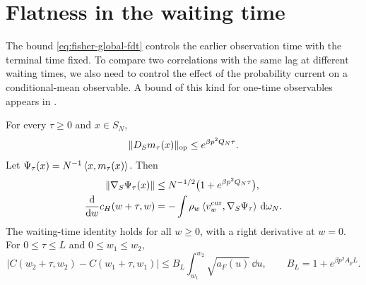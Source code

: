 \section{Flatness in the waiting time}\label{sec:waiting-time-flatness}

The bound \eqref{eq:fisher-global-fdt} controls the earlier observation time with the terminal time fixed. To compare two correlations with the same lag at different waiting times, we also need to control the effect of the probability current on a conditional-mean observable. A bound of this kind for one-time observables appears in \cite[arXiv version~2, equation~(15), p.~3]{cdk1997}.

\begin{lemma}\label{lem:waiting-clock-current}
For every $\tau\ge0$ and $x\in S_N$,
\begin{equation}
 \lVert D_Sm_\tau(x)\rVert_{\mathrm{op}}\le e^{\beta p^2Q_N\tau}.
 \label{eq:conditional-mean-gradient}
\end{equation}
Let $\Psi_\tau(x)=N^{-1}\left\langle x,m_\tau(x)\right\rangle$. Then
\begin{align}
 \lVert\nabla_S\Psi_\tau(x)\rVert
 &\le N^{-1/2}\bigl(1+e^{\beta p^2Q_N\tau}\bigr),
 \label{eq:waiting-observable-gradient}\\
 \frac{\mathop{}\!\mathrm d}{\mathop{}\!\mathrm d w}c_H(w+\tau,w)
 &=-\int\rho_w\left\langle v^{\mathrm{cur}}_w,\nabla_S\Psi_\tau\right\rangle\,\mathop{}\!\mathrm d\omega_N.
 \label{eq:waiting-clock-current}
\end{align}
The waiting-time identity holds for all $w\ge0$, with a right derivative at $w=0$.
For $0\le\tau\le L$ and $0\le w_1\le w_2$,
\begin{equation}
 |C(w_2+\tau,w_2)-C(w_1+\tau,w_1)|
 \le B_L\int_{w_1}^{w_2}\sqrt{a_F(u)}\,\dd u,
 \qquad B_L=1+e^{\beta p^2A_pL}.
 \label{eq:ck-measure-waiting-shift}
\end{equation}
\end{lemma}

